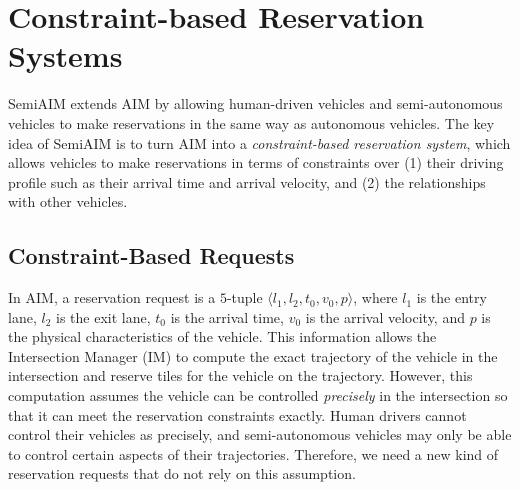 \section{Constraint-based Reservation Systems}
\label{sec:constraint}

SemiAIM extends AIM by allowing human-driven vehicles and
semi-autonomous vehicles to make reservations in the same way as
autonomous vehicles.  The key idea of SemiAIM is to turn AIM into a
\emph{constraint-based reservation system}, which allows vehicles to
make reservations in terms of constraints over (1) their driving
profile such as their arrival time and arrival velocity, and (2) the
relationships with other vehicles.

\subsection{Constraint-Based Requests}

In AIM, a reservation request is a $5$-tuple $\langle l_1, l_2, t_0,
v_0, p\rangle$, where $l_1$ is the entry lane, $l_2$ is the exit lane,
$t_0$ is the arrival time, $v_0$ is the arrival velocity, and $p$ is
the physical characteristics of the vehicle.  This information allows
the Intersection Manager (IM) to compute the exact trajectory of the
vehicle in the intersection and reserve tiles for the vehicle on the
trajectory.  However, this computation assumes the vehicle can be
controlled \emph{precisely} in the intersection so that it can meet
the reservation constraints exactly.  Human drivers cannot control
their vehicles as precisely, and semi-autonomous vehicles may only be
able to control certain aspects of their trajectories.  Therefore, we
need a new kind of reservation requests that do not rely on this
assumption.

